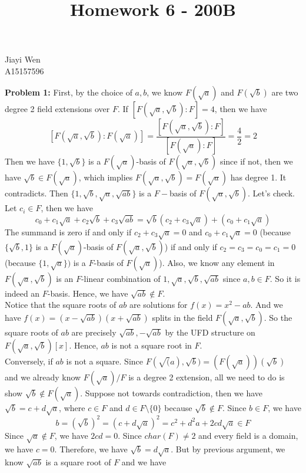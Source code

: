 \documentclass[12pt]{amsart}
\begin{document}
\title{Homework 6 - 200B}
\maketitle
\begin{center}
    Jiayi Wen\\
    A15157596
\end{center}
\textbf{Problem 1:} First, by the choice of $a,b$, we know $F(\sqrt{a})$ and $F(\sqrt{b})$ are two degree 2 field extensions over $F$. If $[F(\sqrt{a},\sqrt{b}):F]=4$, then we have 
\[[F(\sqrt{a},\sqrt{b}):F(\sqrt{a})]=\frac{[F(\sqrt{a},\sqrt{b}):F]}{[F(\sqrt{a}):F]}=\frac{4}{2}=2\]
Then we have $\{1,\sqrt{b}\}$ is a $F(\sqrt{a})$-basis of $F(\sqrt{a},\sqrt{b})$ since if not, then we have $\sqrt{b}\in F(\sqrt{a})$, which implies $F(\sqrt{a},\sqrt{b})=F(\sqrt{a})$ has degree 1. It contradicts. Then $\{1,\sqrt{b},\sqrt{a},\sqrt{ab}\}$ is a $F-$basis of $F(\sqrt{a},\sqrt{b})$. Let's check. Let $c_i\in F$, then we have
\[c_0+c_1\sqrt{a}+c_2\sqrt{b}+c_3\sqrt{ab}=\sqrt{b}(c_2+c_3\sqrt{a})+(c_0+c_1\sqrt{a})\]
The summand is zero if and only if $c_2+c_3\sqrt{a}=0$ and $c_0+c_1\sqrt{a}=0$ (because $\{\sqrt{b},1\}$ is a $F(\sqrt{a})$-basis of $F(\sqrt{a},\sqrt{b})$) if and only if $c_2=c_3=c_0=c_1=0$ (because $\{1,\sqrt{a}\})$ is a $F$-basis of $F(\sqrt{a})$). Also, we know any element in $F(\sqrt{a},\sqrt{b})$ is an $F$-linear combination of $1,\sqrt{a},\sqrt{b},\sqrt{ab}$ since $a,b\in F$. So it is indeed an $F$-basis. Hence, we have $\sqrt{ab}\notin F$.\\
Notice that the square roots of $ab$ are solutions for $f(x)=x^2-ab$. And we have $f(x)=(x-\sqrt{ab})(x+\sqrt{ab})$ splits in the field $F(\sqrt{a},\sqrt{b})$. So the square roots of $ab$ are precisely $\sqrt{ab},-\sqrt{ab}$ by the UFD structure on $F(\sqrt{a},\sqrt{b})[x]$. Hence, $ab$ is not a square root in $F$.
\\Conversely, if $ab$ is not a square. Since $F(\sqrt(a),\sqrt{b})=(F(\sqrt{a}))(\sqrt{b})$ and we already know $F(\sqrt{a})/F$ is a degree 2 extension, all we need to do is show $\sqrt{b}\notin F(\sqrt{a})$. Suppose not towards contradiction, then we have $\sqrt{b}=c+d\sqrt{a}$, where $c\in F$ and $d\in F\setminus\{0\}$ because $\sqrt{b}\notin F$. Since $b\in F$, we have 
\[b=(\sqrt{b})^2=(c+d\sqrt{a})^2=c^2+d^2a+2cd\sqrt{a}\in F\]
Since $\sqrt{a}\notin F$, we have $2cd=0$. Since $char(F)\neq 2$ and every field is a domain, we have $c=0$. Therefore, we have $\sqrt{b}=d\sqrt{a}$. But by previous argument, we know $\sqrt{ab}$ is a square root of $F$ and we have 
\end{document}
